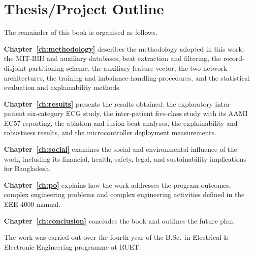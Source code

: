 \section{Thesis/Project Outline}
\label{sec:outline}

The remainder of this book is organised as follows.

\textbf{Chapter~\ref{ch:methodology}} describes the methodology adopted in
this work: the MIT-BIH and auxiliary databases, beat extraction and
filtering, the record-disjoint partitioning scheme, the auxiliary feature
vector, the two network architectures, the training and imbalance-handling
procedures, and the statistical evaluation and explainability methods.

\textbf{Chapter~\ref{ch:results}} presents the results obtained: the
exploratory intra-patient six-category ECG study, the inter-patient five-class study with its
AAMI EC57 reporting, the ablation and fusion-beat analyses, the
explainability and robustness results, and the microcontroller deployment
measurements.

\textbf{Chapter~\ref{ch:social}} examines the social and environmental
influence of the work, including its financial, health, safety, legal, and
sustainability implications for Bangladesh.

\textbf{Chapter~\ref{ch:po}} explains how the work addresses the program
outcomes, complex engineering problems and complex engineering activities
defined in the EEE 4000 manual.

\textbf{Chapter~\ref{ch:conclusion}} concludes the book and outlines the
future plan.

The work was carried out over the fourth year of the B.Sc.\ in
Electrical \& Electronic Engineering programme at RUET.